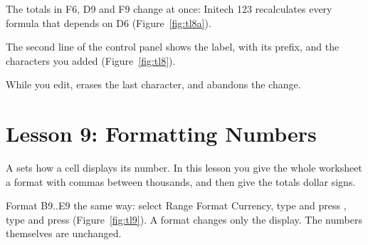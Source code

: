 \begin{Keystrokes}
\end{Keystrokes}
The totals in F6, D9 and F9 change at once: Initech 123 recalculates every
formula that depends on D6 (Figure~\ref{fig:tl8a}).

\begin{Keystrokes}
\end{Keystrokes}
The second line of the control panel shows the label, with its prefix, and
the characters you added (Figure~\ref{fig:tl8}).
\begin{Keystrokes}
\end{Keystrokes}
While you edit,  erases the last character, and
 abandons the change.

\section{Lesson 9: Formatting Numbers}
A  sets how a cell displays its number.  In this lesson you
give the whole worksheet a format with commas between thousands, and then
give the totals dollar signs.

\begin{Keystrokes}
\end{Keystrokes}
\begin{Keystrokes}
\end{Keystrokes}
Format B9..E9 the same way: select Range Format Currency, type 
and press , type  and press 
(Figure~\ref{fig:tl9}).
A format changes only the display.  The numbers themselves are unchanged.

